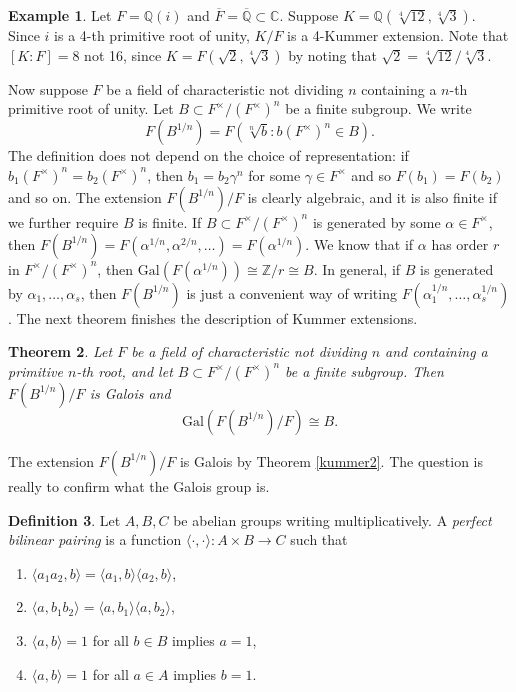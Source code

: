 \documentclass[12pt]{report}
\newtheorem{theorem}{Theorem}[section]
\theoremstyle{definition}
\newtheorem{definition}[theorem]{Definition}
\newtheorem{example}[theorem]{Example}
\newcommand{\gal}{\text{Gal}}
\newcommand{\cc}{\mathbb{C}}
\newcommand{\zz}{\mathbb{Z}}
\newcommand{\ta}[1]{\langle #1 \rangle}
\newcommand{\qq}{\mathbb{Q}}
\begin{document}
\begin{example}
	Let $F=\qq(i)$ and $\overline{F}=\overline{\qq}\subset \cc$. Suppose $K=\qq(\sqrt[4]{12},\sqrt[4]{3})$. Since $i$ is a 4-th primitive root of unity, $K/F$ is a 4-Kummer extension. Note that $[K:F]=8$ not 16, since $K=F(\sqrt{2},\sqrt[4]{3})$ by noting that $\sqrt{2}=\sqrt[4]{12}/\sqrt[4]{3}$.
\end{example}

Now suppose $F$ be a field of characteristic not dividing $n$ containing a $n$-th primitive root of unity. Let $B\subset F^\times/(F^{\times})^{n}$ be a finite subgroup. We write \[F(B^{1/n})=F(\sqrt[n]{b}: b(F^\times)^n\in B).\]
The definition does not depend on the choice of representation: if $b_1(F^\times)^n=b_2(F^\times)^n$, then $b_1=b_2\gamma^n$ for some $\gamma\in F^\times$ and so $F(b_1)=F(b_2)$ and so on. The extension $F(B^{1/n})/F$ is clearly algebraic, and it is also finite if we further require $B$ is finite. If $B\subset F^\times/(F^{\times})^{n}$ is generated by some $\alpha\in F^\times$, then $F(B^{1/n})=F(\alpha^{1/n},\alpha^{2/n},\dots)=F(\alpha^{1/n})$. We know that if $\alpha$ has order $r$ in $F^\times/(F^{\times})^{n}$, then $\gal(F(\alpha^{1/n}))\cong \zz/r\cong B$. In general, if $B$ is generated by $\alpha_1,\dots,\alpha_s$, then $F(B^{1/n})$ is just a convenient way of writing $F(\alpha_1^{1/n},\dots,\alpha_s^{1/n})$. The next theorem finishes the description of Kummer extensions.

\begin{theorem}\label{kummer3}
	Let $F$ be a field of characteristic not dividing $n$ and containing a primitive $n$-th root, and let $B\subset F^\times/(F^{\times})^{n}$ be a finite subgroup. Then $F(B^{1/n})/F$ is Galois and $$\gal(F(B^{1/n})/F)\cong B.$$
\end{theorem}

The extension $F(B^{1/n})/F$ is Galois by Theorem \ref{kummer2}. The question is really to confirm what the Galois group is.

\begin{definition}
	Let $A,B,C$ be abelian groups writing multiplicatively. A \emph{perfect bilinear pairing} is a function $\langle \cdot,\cdot\rangle: A\times B\to C$ such that
	\begin{enumerate}
		\item $\ta{a_1a_2,b}=\ta{a_1,b}\ta{a_2,b}$,
		\item $\ta{a,b_1b_2}=\ta{a,b_1}\ta{a,b_2}$,
		\item $\ta{a,b}=1$ for all $b\in B$ implies $a=1$,
		\item $\ta{a,b}=1$ for all $a\in A$ implies $b=1$.
	\end{enumerate}
\end{definition}
\end{document}
